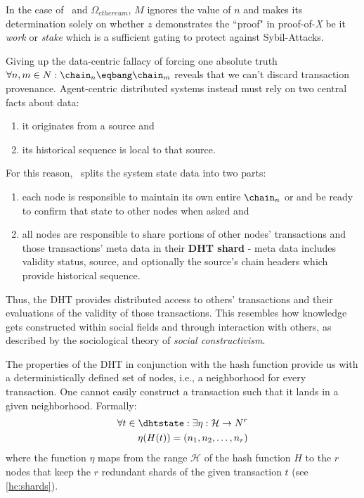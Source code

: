 \documentclass[twocolumn,showpacs,
  nofootinbib,aps,superscriptaddress,
  eqsecnum,prd,notitlepage,showkeys,10pt]{revtex4-1}
\begin{document}
In the case of \sbtc\ and $\Omega_{ethereum}$, $M$ ignores the value of $n$ and makes its determination solely on whether $z$ demonstrates the ``proof" in proof-of-\textit{X} be it \textit{work} or \textit{stake} which is a sufficient gating to protect against Sybil-Attacks.

Giving up the data-centric fallacy of forcing one absolute truth $\forall n,m \in N: \chain_n\eqbang\chain_m$ reveals that we can't discard transaction provenance.
Agent-centric distributed systems instead must rely on two central facts about data:
\begin{enumerate}
\item it originates from a source and
\item its historical sequence is local to that source.
\end{enumerate}
For this reason, \shc\ splits the system state data into two parts:
\begin{enumerate}
\item each node is responsible to maintain its own entire $\chain_n$ or  and be ready to confirm that state to other nodes when asked and
\item all nodes are responsible to share portions of other nodes' transactions and those transactions' meta data in their \textbf{DHT shard} - meta data includes validity status, source, and optionally the source's chain headers which provide historical sequence.
\end{enumerate}

Thus, the DHT provides distributed access to others' transactions and their evaluations of the validity of those transactions.
This resembles how knowledge gets constructed within social fields and through interaction with others, as described by the sociological theory of \textit{social constructivism}.

The properties of the DHT in conjunction with the hash function provide us with a
deterministically defined set of nodes, i.e., a neighborhood for every transaction.
One cannot easily construct a transaction such that it lands in a given neighborhood.
Formally:
\begin{equation}
\begin{split}
\forall t\in\dhtstate: \exists \eta: \mathcal{H}\rightarrow N^r\\
\eta(H(t))=(n_1, n_2, \dots, n_r)
\end{split}
\end{equation}
where the function $\eta$ maps from the range $\mathcal{H}$ of the hash function $H$
to the $r$ nodes that keep the $r$ redundant shards of the given transaction $t$ (see \ref{hc:shards}).
\end{document}
